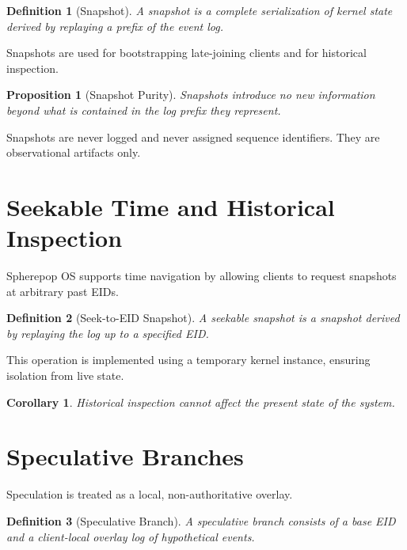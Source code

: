 \documentclass[11pt]{article}
\newtheorem{definition}{Definition}[section]
\newtheorem{proposition}{Proposition}[section]
\newtheorem{corollary}{Corollary}[section]
\begin{document}
\begin{definition}[Snapshot]
A snapshot is a complete serialization of kernel state derived by replaying a prefix of the event log.
\end{definition}

Snapshots are used for bootstrapping late-joining clients and for historical inspection.

\begin{proposition}[Snapshot Purity]
\label{prop:snapshot-purity}
Snapshots introduce no new information beyond what is contained in the log prefix they represent.
\end{proposition}

Snapshots are never logged and never assigned sequence identifiers. They are observational artifacts only.

\section{Seekable Time and Historical Inspection}

Spherepop OS supports time navigation by allowing clients to request snapshots at arbitrary past EIDs.

\begin{definition}[Seek-to-EID Snapshot]
A seekable snapshot is a snapshot derived by replaying the log up to a specified EID.
\end{definition}

This operation is implemented using a temporary kernel instance, ensuring isolation from live state.

\begin{corollary}
Historical inspection cannot affect the present state of the system.
\end{corollary}

\section{Speculative Branches}
\label{sec:speculative-branches}

Speculation is treated as a local, non-authoritative overlay.

\begin{definition}[Speculative Branch]
A speculative branch consists of a base EID and a client-local overlay log of hypothetical events.
\end{definition}
\end{document}
